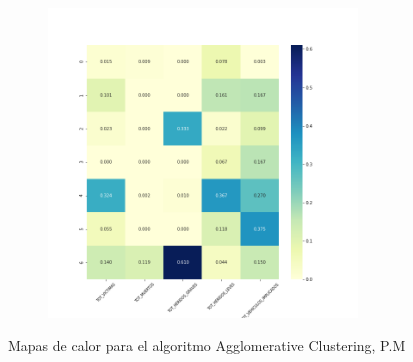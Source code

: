 \begin{figure}[H]
\begin{subfigure}{.5\textwidth}
\end{subfigure}
\begin{subfigure}{.5\textwidth}
  \centering
  \includegraphics[width=0.9\textwidth]{imagenes/case2/agglomerative/heatmaps/hm_agglomerative_case2_entrada_k7.png}
\end{subfigure}
\caption{Mapas de calor para el algoritmo Agglomerative Clustering, P.M}
\label{fig:hm-km}
\end{figure}

